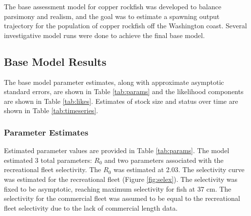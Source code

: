 \documentclass[11pt,
  english,
  a4paper,
]{article}
\begin{document}
The base assessment model for copper rockfish was developed to balance parsimony and realism, and the goal was to estimate a spawning output trajectory for the population of copper rockfish off the Washington coast. Several investigative model runs were done to achieve the final base model.

\leavevmode\tagmcend\tagstructend\par


\hypertarget{base-model-results}{%
\subsection{Base Model Results}\label{base-model-results}}

\leavevmode\tagmcend\tagstructend


The base model parameter estimates, along with approximate asymptotic standard errors, are shown in Table \ref{tab:params} and the likelihood components are shown in Table \ref{tab:likes}. Estimates of stock size and status over time are shown in Table \ref{tab:timeseries}.

\leavevmode\tagmcend\tagstructend\par


\hypertarget{parameter-estimates}{%
\subsubsection{Parameter Estimates}\label{parameter-estimates}}

\leavevmode\tagmcend\tagstructend


Estimated parameter values are provided in Table \ref{tab:params}. The model estimated 3 total parameters: {\(R_0\)\leavevmode\tagmcend\tagstructend} and two parameters associated with the recreational fleet selectivity. The {\(R_0\)\leavevmode\tagmcend\tagstructend} was estimated at 2.03. The selectivity curve was estimated for the recreational fleet (Figure \ref{fig:selex}). The selectivity was fixed to be asymptotic, reaching maximum selectivity for fish at 37 cm. The selectivity for the commercial fleet was assumed to be equal to the recreational fleet selectivity due to the lack of commercial length data.
\end{document}
